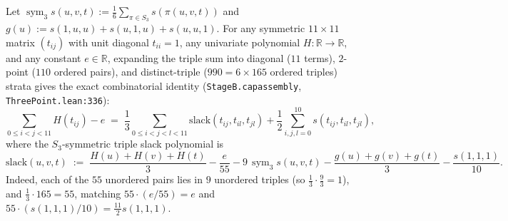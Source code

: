 \documentclass[11pt,reqno]{amsart}
\renewcommand{\_}{\origunderscore\allowbreak}
\theoremstyle{definition}
\newcommand{\R}{\mathbb{R}}
\begin{document}
Let $\operatorname{sym}_3 s(u,v,t) := \frac{1}{6}\sum_{\pi \in S_3} s(\pi(u,v,t))$ and $g(u) := s(1,u,u) + s(u,1,u) + s(u,u,1)$.
For any symmetric $11\times 11$ matrix $(t_{ij})$ with unit diagonal $t_{ii} = 1$, any univariate polynomial $H : \R \to \R$, and any constant $e \in \R$, expanding the triple sum into diagonal ($11$ terms), $2$-point ($110$ ordered pairs), and distinct-triple ($990 = 6 \times 165$ ordered triples) strata gives the exact combinatorial identity (\texttt{StageB.cap\_assembly\_11}, \texttt{ThreePoint.lean:336}):
\begin{equation}\label{eq:cap-assembly-11}
  \sum_{0 \le i < j < 11} H(t_{ij}) - e
  \;=\; \frac{1}{3} \sum_{0 \le i < j < l < 11} \mathrm{slack}(t_{ij}, t_{il}, t_{jl})
  + \frac{1}{2} \sum_{i,j,l=0}^{10} s(t_{ij}, t_{il}, t_{jl}),
\end{equation}
where the $S_3$-symmetric triple slack polynomial is
\begin{equation}\label{eq:slack-def}
  \mathrm{slack}(u,v,t) \;:=\; \frac{H(u)+H(v)+H(t)}{3} - \frac{e}{55} - 9\,\operatorname{sym}_3 s(u,v,t) - \frac{g(u)+g(v)+g(t)}{3} - \frac{s(1,1,1)}{10}.
\end{equation}
Indeed, each of the $55$ unordered pairs lies in $9$ unordered triples (so $\frac{1}{3}\cdot\frac{9}{3} = 1$), and $\frac{1}{3}\cdot 165 = 55$, matching $55 \cdot (e/55) = e$ and $55 \cdot (s(1,1,1)/10) = \frac{11}{2} s(1,1,1)$.
\end{document}
